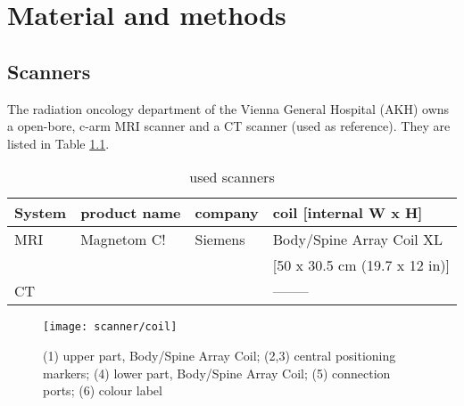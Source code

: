 

\chapter{Material and methods}


\section{Scanners}

The radiation oncology department of the Vienna General Hospital (AKH) owns a open-bore, c-arm MRI scanner and a CT scanner (used as reference).
They are listed in Table \ref{tab:scanners}.

\begin{table}[h]
\centering
\begin{tabular}{llll}
System	& product name	& company	& coil [internal W x H]		\\
\toprule
MRI	& Magnetom C!	& Siemens	& Body/Spine Array Coil XL	\\
	&		&		& [50 x 30.5 cm (19.7 x 12 in)]	\\
CT	&		&		& --------
\end{tabular}
\caption{used scanners}
\label{tab:scanners}
\end{table}

\begin{figure}[tbh!]
\centering
\texttt{[image: scanner/coil]}
\caption{(1) upper part, Body/Spine Array Coil; (2,3) central positioning markers; (4) lower part, Body/Spine Array Coil; (5) connection ports; (6) colour label}
\label{fig:coil}
\end{figure}


